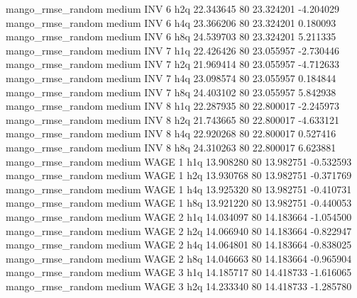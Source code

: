 mango_rmse_random     medium      INV                 6                  h2q 22.343645 80      23.324201          -4.204029
mango_rmse_random     medium      INV                 6                  h4q 23.366206 80      23.324201           0.180093
mango_rmse_random     medium      INV                 6                  h8q 24.539703 80      23.324201           5.211335
mango_rmse_random     medium      INV                 7                  h1q 22.426426 80      23.055957          -2.730446
mango_rmse_random     medium      INV                 7                  h2q 21.969414 80      23.055957          -4.712633
mango_rmse_random     medium      INV                 7                  h4q 23.098574 80      23.055957           0.184844
mango_rmse_random     medium      INV                 7                  h8q 24.403102 80      23.055957           5.842938
mango_rmse_random     medium      INV                 8                  h1q 22.287935 80      22.800017          -2.245973
mango_rmse_random     medium      INV                 8                  h2q 21.743665 80      22.800017          -4.633121
mango_rmse_random     medium      INV                 8                  h4q 22.920268 80      22.800017           0.527416
mango_rmse_random     medium      INV                 8                  h8q 24.310263 80      22.800017           6.623881
mango_rmse_random     medium     WAGE                 1                  h1q 13.908280 80      13.982751          -0.532593
mango_rmse_random     medium     WAGE                 1                  h2q 13.930768 80      13.982751          -0.371769
mango_rmse_random     medium     WAGE                 1                  h4q 13.925320 80      13.982751          -0.410731
mango_rmse_random     medium     WAGE                 1                  h8q 13.921220 80      13.982751          -0.440053
mango_rmse_random     medium     WAGE                 2                  h1q 14.034097 80      14.183664          -1.054500
mango_rmse_random     medium     WAGE                 2                  h2q 14.066940 80      14.183664          -0.822947
mango_rmse_random     medium     WAGE                 2                  h4q 14.064801 80      14.183664          -0.838025
mango_rmse_random     medium     WAGE                 2                  h8q 14.046663 80      14.183664          -0.965904
mango_rmse_random     medium     WAGE                 3                  h1q 14.185717 80      14.418733          -1.616065
mango_rmse_random     medium     WAGE                 3                  h2q 14.233340 80      14.418733          -1.285780

